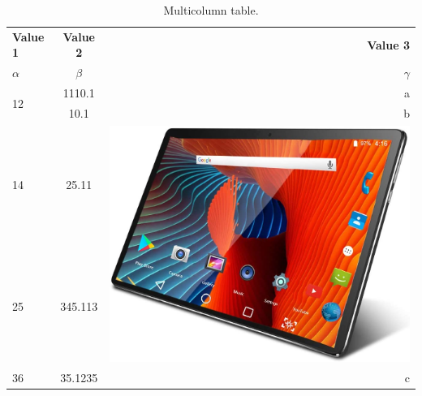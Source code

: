 \documentclass{article}
\begin{document}
	\begin{table}[h!]
		\begin{center}
			\caption{Multicolumn table.}
			\label{tab:table1}
			\begin{tabular}{| l | c | r |}
				\hline
				\textbf{Value 1} & \textbf{Value 2 } & \textbf{Value 3}\\
				$\alpha$ & $\beta$ & $\gamma$\\
				\hline
				\multirow{2}{*}{12} & 1110.1 & a\\
				 & 10.1 & b\\
				\hline
				14 & 25.11 & 
				\multirow{2}{*}{\includegraphics[width=0.07\linewidth]{productimg.jpeg}}\\
			 25 & 345.113 & \\
				\hline
			36 & 35.1235 & c\\
				\hline
			\end{tabular}
			
		\end{center}
	\end{table}
\end{document}
